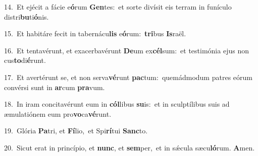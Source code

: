 {\numbfont\textcolor{\numbcolor}{14.}}~Et ejécit a fácie e\-\textbf{ó}\-rum \textbf{Gen}\-tes:~\star et sorte divísit eis terram in funículo distri\-\textbf{bu}\-ti\-\textbf{ó}\-nis.\par
{\numbfont\textcolor{\numbcolor}{15.}}~Et habitáre fecit in tabernácu\textbf{lis} e\-\textbf{ó}\-rum:~\star \textbf{tri}\-bus \textbf{Is}\-raël.\par
{\numbfont\textcolor{\numbcolor}{16.}}~Et tentavérunt, et exacerbavérunt \textbf{De}\-um ex\-\textbf{cél}\-sum:~\star et testimónia ejus non cus\-\textbf{to}\-di\-\textbf{é}\-runt.\par
{\numbfont\textcolor{\numbcolor}{17.}}~Et avertérunt se, et non serva\-\textbf{vé}\-runt \textbf{pac}\-tum:~\star quemádmodum patres eórum convérsi sunt in \textbf{ar}\-cum \textbf{pra}\-vum.\par
{\numbfont\textcolor{\numbcolor}{18.}}~In iram concitavérunt eum in \textbf{cól}\-libus \textbf{su}\-is:~\star et in sculptílibus suis ad æmulatiónem eum pro\-\textbf{vo}\-ca\-\textbf{vé}\-runt.\par
{\numbfont\textcolor{\numbcolor}{19.}}~Glória \textbf{Pa}\-tri, et \textbf{Fí}\-lio,~\star et Spi\-\textbf{rí}\-tui \textbf{Sanc}\-to.\par
{\numbfont\textcolor{\numbcolor}{20.}}~Sicut erat in princípio, et \textbf{nunc}\-, et \textbf{sem}\-per,~\star et in sǽcula sæcu\-\textbf{ló}\-rum. \textbf{A}\-men.\par
